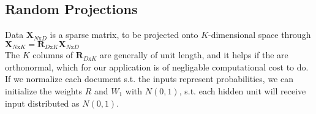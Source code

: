 \subsection{Random Projections}

Data $\mathbf{X}_{N\text{x}D}$ is a sparse matrix, to be projected onto $K$-dimensional space through $\mathbf{X}_{N\text{x}K} = \mathbf{R}_{D\text{x}K}\mathbf{X}_{N\text{x}D}$
\\
The $K$ columns of $\mathbf{R}_{D\text{x}K}$ are generally of unit length, and it helps if the are orthonormal, which for our application is of negligable computational cost to do. If we normalize each document s.t. the inputs represent probabilities, we can initialize the weights $R$ and $W_1$ with $N(0,1)$, s.t. each hidden unit will receive input distributed as $N(0,1)$. 
